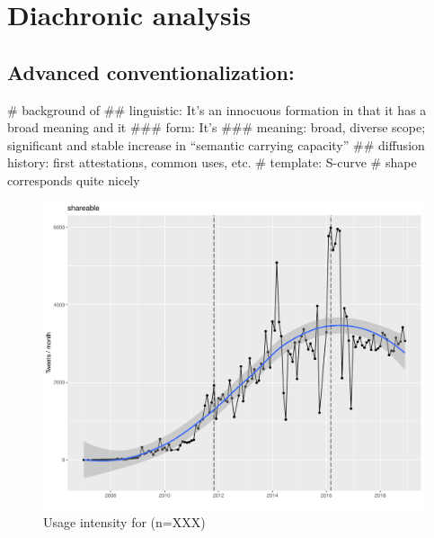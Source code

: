 \documentclass[
  a4paper,
  ]{scrartcl}
\begin{document}
\section{Diachronic analysis}

  \subsection{Advanced conventionalization: }

    \begin{easylist}[itemize]
      # background of 
        ## linguistic: It's an innocuous formation in that it has a broad meaning and it
          ### form: It's
          ### meaning: broad, diverse scope; significant and stable increase in \enquote{semantic carrying capacity} \parencite{Grieve2016}
        ## diffusion history: first attestations, common uses, etc.
      # template: S-curve
        # shape corresponds quite nicely
    \end{easylist}

    \begin{figure}[H]
      \centering
      \includegraphics[width=\linewidth, height=.8\textheight, keepaspectratio]{images/ui_shareable.pdf}
      \caption{Usage intensity for  (n=XXX)}
    \end{figure}
\end{document}
